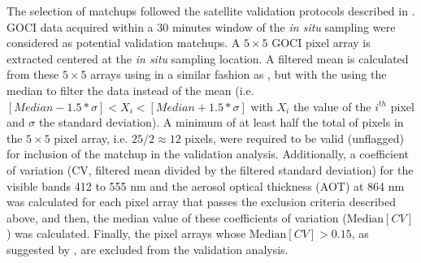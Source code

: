 \documentclass[10pt]{article}
\begin{document}
The selection of matchups followed the satellite validation protocols described in \cite{Bailey2006}. GOCI data acquired within a 30 minutes window of the {\it in situ} sampling were considered as potential validation matchups. A $5\times5$ GOCI pixel array is extracted centered at the {\it in situ} sampling location.
A filtered mean is calculated from these $5\times5$ arrays using in a similar fashion as \cite{Bailey2006}, but with the using the median to filter the data instead of the mean (i.e. $[Median-1.5*\sigma] <  X_i < [Median+1.5*\sigma]$ with $X_i$ the value of the $i^{th}$ pixel and $\sigma$ the standard deviation). A minimum of at least half the total of pixels in the $5\times5$ pixel array, i.e. $25/2\approx12$ pixels, were required to be valid (unflagged) for inclusion of the matchup in the validation analysis. Additionally, a coefficient of variation (CV, filtered mean divided by the filtered standard deviation) for the visible bands 412 to 555 nm and the aerosol optical thickness (AOT) at 864 nm was calculated for each pixel array that passes the exclusion criteria described above, and then, the median value of these coefficients of variation ($\text{Median}[CV]$) was calculated. Finally, the pixel arrays whose $\text{Median}[CV]>0.15$, as suggested by \cite{Bailey2006}, are excluded from the validation analysis.
\end{document}
